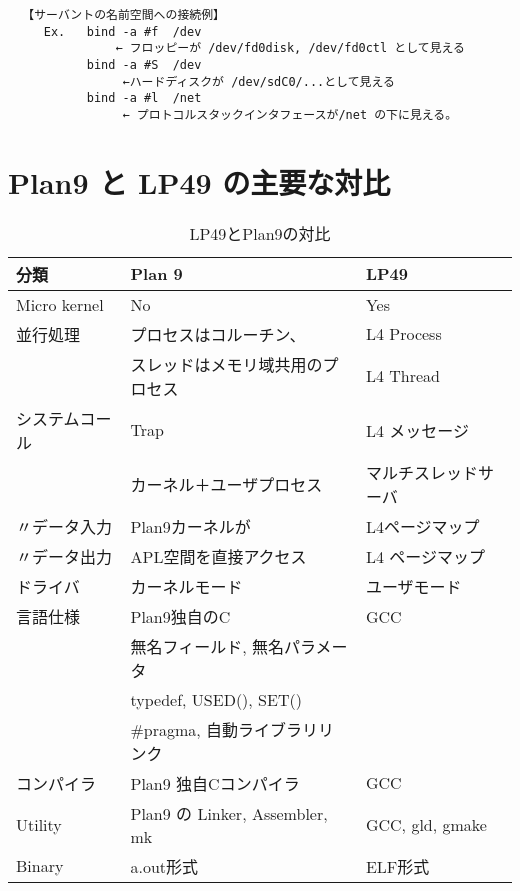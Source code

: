 {\small
\begin{verbatim}
  【サーバントの名前空間への接続例】
     Ex.   bind -a #f  /dev    
               ← フロッピーが /dev/fd0disk, /dev/fd0ctl として見える
           bind -a #S  /dev    
                ←ハードディスクが /dev/sdC0/...として見える
           bind -a #l  /net    
                ← プロトコルスタックインタフェースが/net の下に見える。
\end{verbatim}
}




\chapter{Plan9 と LP49 の主要な対比}

\begin{table}[htb]
\caption[Plan9vsLP40]{LP49とPlan9の対比 }
\label{table:LP49-Plan9}
\begin{center}
{\footnotesize 
\begin{tabular}{|l|l|l|}
\hline
 分類  & Plan 9 & LP49 \\
\hline

Micro kernel  &     No        &   Yes   \\
\hline

並行処理  &  プロセスはコルーチン、 &   L4 Process  \\
          &  スレッドはメモリ域共用のプロセス &  L4 Thread \\
\hline

システムコール    & Trap       &     L4 メッセージ \\
                  & カーネル＋ユーザプロセス    & マルチスレッドサーバ \\
\hline

〃データ入力      & Plan9カーネルが   & L4ページマップ \\
〃データ出力      & APL空間を直接アクセス          & L4 ページマップ \\
\hline

ドライバ     & カーネルモード    & ユーザモード  \\
\hline

言語仕様 &  Plan9独自のC                     &   GCC  　\\
         &  無名フィールド, 無名パラメータ   & \\
         &  typedef, USED(), SET()           &    \\
         &   \#pragma, 自動ライブラリリンク  & \\
\hline

コンパイラ  &   Plan9 独自Cコンパイラ   &   GCC \\
\hline

 Utility  &  Plan9 の Linker, Assembler, mk    & GCC, gld, gmake \\
\hline

Binary    &  a.out形式         &    ELF形式 \\
\hline

\end{tabular}
}
\end{center}
\end{table}



